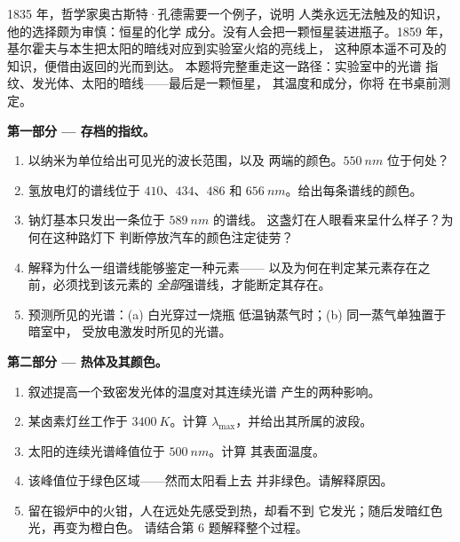 \begin{problem}
\label{pb:g10:light-spectra:1}
1835 年，哲学家奥古斯特·孔德需要一个例子，说明
人类永远无法触及的知识，他的选择颇为审慎：恒星的化学
成分。没有人会把一颗恒星装进瓶子。1859 年，
基尔霍夫与本生把太阳的暗线对应到实验室火焰的亮线上，
这种原本遥不可及的知识，便借由返回的光而到达。
本题将完整重走这一路径：实验室中的光谱
指纹、发光体、太阳的暗线——最后是一颗恒星，
其温度和成分，你将
在书桌前测定。

\medskip
\noindent\textbf{第一部分 --- 存档的指纹。}
\begin{enumerate}
  \item 以纳米为单位给出可见光的波长范围，以及
        两端的颜色。$\qty{550}{nm}$ 位于何处？
  \item 氢放电灯的谱线位于 $410$、$434$、$486$
        和 $\qty{656}{nm}$。给出每条谱线的颜色。
  \item 钠灯基本只发出一条位于 $\qty{589}{nm}$ 的谱线。
        这盏灯在人眼看来呈什么样子？为何在这种路灯下
        判断停放汽车的颜色注定徒劳？
  \item 解释为什么一组谱线能够鉴定一种元素——
        以及为何在判定某元素存在之前，必须找到该元素的
        \emph{全部}强谱线，才能断定其存在。
  \item 预测所见的光谱：(a) 白光穿过一烧瓶
        低温钠蒸气时；(b) 同一蒸气单独置于暗室中，
        受放电激发时所见的光谱。
\end{enumerate}

\medskip
\noindent\textbf{第二部分 --- 热体及其颜色。}
\begin{enumerate}[resume]
  \item 叙述提高一个致密发光体的温度对其连续光谱
        产生的两种影响。
  \item 某卤素灯丝工作于 $\qty{3400}{K}$。计算
        $\lambda_{\max}$，并给出其所属的波段。
  \item 太阳的连续光谱峰值位于 $\qty{500}{nm}$。计算
        其表面温度。
  \item 该峰值位于绿色区域——然而太阳看上去
        并非绿色。请解释原因。
  \item 留在锻炉中的火钳，人在远处先感受到热，却看不到
        它发光；随后发暗红色光，再变为橙白色。
        请结合第 6 题解释整个过程。
\end{enumerate}


\end{problem}
